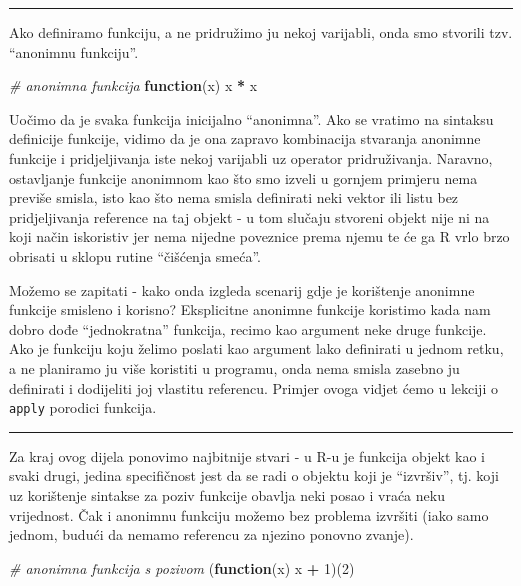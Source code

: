 \documentclass[]{book}
\newenvironment{Shaded}{\begin{snugshade}}{\end{snugshade}}
\newcommand{\DecValTok}[1]{\textcolor[rgb]{0.00,0.00,0.81}{#1}}
\newcommand{\StringTok}[1]{\textcolor[rgb]{0.31,0.60,0.02}{#1}}
\newcommand{\CommentTok}[1]{\textcolor[rgb]{0.56,0.35,0.01}{\textit{#1}}}
\newcommand{\ControlFlowTok}[1]{\textcolor[rgb]{0.13,0.29,0.53}{\textbf{#1}}}
\newcommand{\OperatorTok}[1]{\textcolor[rgb]{0.81,0.36,0.00}{\textbf{#1}}}
\newcommand{\NormalTok}[1]{#1}
\theoremstyle{definition}
\theoremstyle{definition}
\theoremstyle{definition}
\theoremstyle{remark}
\begin{document}
\begin{center}\rule{0.5\linewidth}{\linethickness}\end{center}

Ako definiramo funkciju, a ne pridružimo ju nekoj varijabli, onda smo
stvorili tzv. ``anonimnu funkciju''.

\begin{Shaded}
\begin{Highlighting}[]
\CommentTok{# anonimna funkcija}
\ControlFlowTok{function}\NormalTok{(x) x }\OperatorTok{*}\StringTok{ }\NormalTok{x }
\end{Highlighting}
\end{Shaded}

Uočimo da je svaka funkcija inicijalno ``anonimna''. Ako se vratimo na
sintaksu definicije funkcije, vidimo da je ona zapravo kombinacija
stvaranja anonimne funkcije i pridjeljivanja iste nekoj varijabli uz
operator pridruživanja. Naravno, ostavljanje funkcije anonimnom kao što
smo izveli u gornjem primjeru nema previše smisla, isto kao što nema
smisla definirati neki vektor ili listu bez pridjeljivanja reference na
taj objekt - u tom slučaju stvoreni objekt nije ni na koji način
iskoristiv jer nema nijedne poveznice prema njemu te će ga R vrlo brzo
obrisati u sklopu rutine ``čišćenja smeća''.

Možemo se zapitati - kako onda izgleda scenarij gdje je korištenje
anonimne funkcije smisleno i korisno? Eksplicitne anonimne funkcije
koristimo kada nam dobro dođe ``jednokratna'' funkcija, recimo kao
argument neke druge funkcije. Ako je funkciju koju želimo poslati kao
argument lako definirati u jednom retku, a ne planiramo ju više
koristiti u programu, onda nema smisla zasebno ju definirati i
dodijeliti joj vlastitu referencu. Primjer ovoga vidjet ćemo u lekciji o
\texttt{apply} porodici funkcija.

\begin{center}\rule{0.5\linewidth}{\linethickness}\end{center}

Za kraj ovog dijela ponovimo najbitnije stvari - u R-u je funkcija
objekt kao i svaki drugi, jedina specifičnost jest da se radi o objektu
koji je ``izvršiv'', tj. koji uz korištenje sintakse za poziv funkcije
obavlja neki posao i vraća neku vrijednost. Čak i anonimnu funkciju
možemo bez problema izvršiti (iako samo jednom, budući da nemamo
referencu za njezino ponovno zvanje).

\begin{Shaded}
\begin{Highlighting}[]
\CommentTok{# anonimna funkcija s pozivom}
\NormalTok{(}\ControlFlowTok{function}\NormalTok{(x) x }\OperatorTok{+}\StringTok{ }\DecValTok{1}\NormalTok{)(}\DecValTok{2}\NormalTok{)}
\end{Highlighting}
\end{Shaded}
\end{document}
